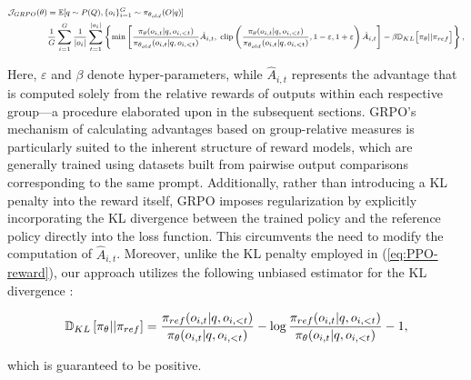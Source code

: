 \begin{itemize}[topsep=0pt]
\begin{equation}
\footnotesize
\begin{split}
    \mathcal{J}_{GRPO}(\theta) &= \mathbb{E}{[q \sim P(Q), \{o_i\}_{i=1}^G \sim \pi_{\theta_{old}}(O|q)]}  \\
    & \frac{1}{G} \sum_{i=1}^G \frac{1}{|o_i|} \sum_{t=1}^{|o_i|} \left\{ \min \left[ \frac{\pi_\theta(o_{i,t} | q, o_{i,<t})}{\pi_{\theta_{old}}(o_{i,t} | q, o_{i,<t})} \hat{A}_{i,t},\; \text{clip} \left( \frac{\pi_\theta(o_{i,t} | q, o_{i,<t})}{\pi_{\theta_{old}}(o_{i,t} | q, o_{i,<t})}, 1 - \varepsilon, 1 + \varepsilon \right) \hat{A}_{i,t} \right] - \beta \mathbb{D}_{KL}\big[\pi_{\theta} || \pi_{ref}\big] \right\} ,
\end{split}
\label{eq:GRPO-obj}
\end{equation}

Here, $\varepsilon$ and $\beta$ denote hyper-parameters, while $\hat{A}_{i,t}$ represents the advantage that is computed solely from the relative rewards of outputs within each respective group—a procedure elaborated upon in the subsequent sections. GRPO’s mechanism of calculating advantages based on group-relative measures is particularly suited to the inherent structure of reward models, which are generally trained using datasets built from pairwise output comparisons corresponding to the same prompt. Additionally, rather than introducing a KL penalty into the reward itself, GRPO imposes regularization by explicitly incorporating the KL divergence between the trained policy and the reference policy directly into the loss function. This circumvents the need to modify the computation of $\hat{A}_{i,t}$. Moreover, unlike the KL penalty employed in (\ref{eq:PPO-reward}), our approach utilizes the following unbiased estimator for the KL divergence \citep{kl_approx}:

\begin{equation}
\small
    \mathbb{D}_{KL}\left[\pi_{\theta} || \pi_{ref}\right] = \frac{\pi_{ref}(o_{i,t}|q,o_{i,<t})}{\pi_{\theta}(o_{i,t}|q,o_{i,<t})}- \log\frac{\pi_{ref}(o_{i,t}|q,o_{i,<t})}{\pi_{\theta}(o_{i,t}|q,o_{i,<t})} - 1,
\end{equation}

which is guaranteed to be positive.


\end{itemize}
